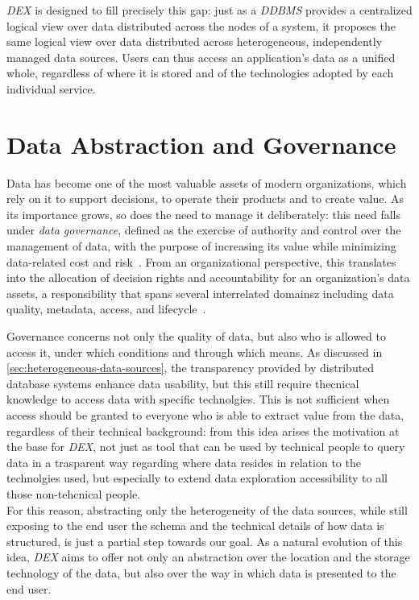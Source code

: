 \textit{DEX} is designed to fill precisely this gap: just as a
\textit{DDBMS} provides a centralized logical view over data distributed
across the nodes of a system, it proposes the same logical view over data
distributed across heterogeneous, independently managed data sources. 
Users can thus access an application's data as a unified whole, regardless of
where it is stored and of the technologies adopted by each individual service.


\section{Data Abstraction and Governance}
Data has become one of the most valuable assets of modern organizations, which
rely on it to support decisions, to operate their products and to create value.
As its importance grows, so does the need to manage it deliberately: this need
falls under \textit{data governance}, defined as the exercise of authority and
control over the management of data, with the purpose of increasing its value
while minimizing data-related cost and risk~\cite{abraham2019data}. From an
organizational perspective, this translates into the allocation of decision
rights and accountability for an organization's data assets, a responsibility
that spans several interrelated domainsz including data quality, metadata,
access, and lifecycle~\cite{khatri2010designing}. 

Governance concerns not only the quality of data, but also who is allowed to
access it, under which conditions and through which means.
As discussed in \autoref{sec:heterogeneous-data-sources}, the transparency
provided by distributed database systems enhance data usability, but this still
require thecnical knowledge to access data with specific technolgies.  This is
not sufficient when access should be granted to everyone who is able to extract
value from the data, regardless of their technical background: from this idea
arises the motivation at the base for \textit{DEX}, not just as tool that can be
used by technical people to query data in a trasparent way regarding where data
resides in relation to the technolgies used, but especially to extend data
exploration accessibility to all those non-tehcnical people. \\
For this reason, abstracting only the heterogeneity of the data sources, while
still exposing to the end user the schema and the technical details of how data
is structured, is just a partial step towards our goal. As a natural evolution
of this idea, \textit{DEX} aims to offer not only an abstraction over the
location and the storage technology of the data, but also over the way in which
data is presented to the end user. 


